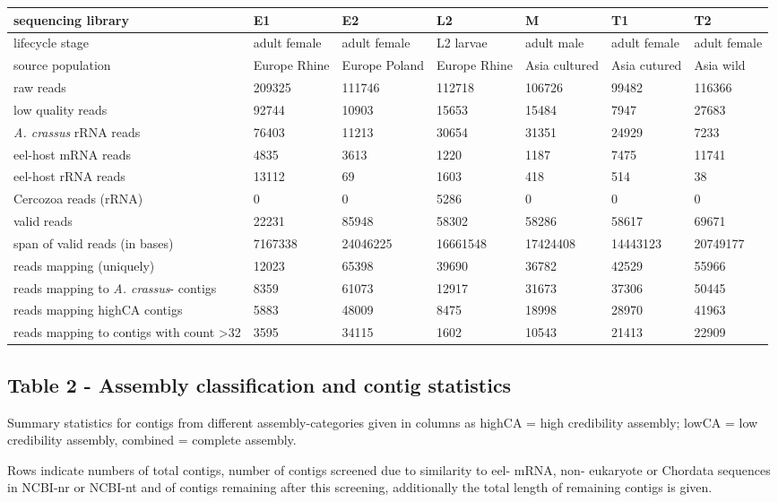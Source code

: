 \documentclass[10pt]{bmc_article}
\newenvironment{bmcformat}{\begin{raggedright}\baselineskip20pt\sloppy\setboolean{publ}{false}}{\end{raggedright}\baselineskip20pt\sloppy}
\begin{document}
\begin{bmcformat}
\begin{tabular}{p{4.5cm}p{1.5cm}p{1.5cm}p{1.5cm}p{1.5cm}p{1.5cm}p{1.5cm}}
   \hline
sequencing library & E1 & E2 & L2 & M & T1 & T2 \\ 
   \hline
lifecycle stage & adult female & adult female & L2 larvae & adult male & adult female & adult female \\ 
  source population & Europe Rhine & Europe Poland & Europe Rhine & Asia cultured & Asia cutured & Asia wild \\ 
  raw reads & 209325 & 111746 & 112718 & 106726 & 99482 & 116366 \\ 
  low quality reads & 92744 & 10903 & 15653 & 15484 & 7947 & 27683 \\ 
  \textit{A. crassus} rRNA reads & 76403 & 11213 & 30654 & 31351 & 24929 & 7233 \\ 
  eel-host mRNA reads & 4835 & 3613 & 1220 & 1187 & 7475 & 11741 \\ 
  eel-host rRNA reads & 13112 & 69 & 1603 & 418 & 514 & 38 \\ 
  Cercozoa reads (rRNA) & 0 & 0 & 5286 & 0 & 0 & 0 \\ 
  valid reads & 22231 & 85948 & 58302 & 58286 & 58617 & 69671 \\ 
  span of valid reads (in bases) & 7167338 & 24046225 & 16661548 & 17424408 & 14443123 & 20749177 \\ 
  reads mapping (uniquely) & 12023 & 65398 & 39690 & 36782 & 42529 & 55966 \\ 
  reads mapping to \textit{A. crassus}- contigs &  8359 & 61073 & 12917 & 31673 & 37306 & 50445 \\ 
  reads mapping highCA contigs &  5883 & 48009 &  8475 & 18998 & 28970 & 41963 \\ 
  reads mapping to contigs with count >32 &  3595 & 34115 &  1602 & 10543 & 21413 & 22909 \\ 
   \hline
\end{tabular}
\subsection*{Table 2 - Assembly classification and contig statistics}

Summary statistics for contigs from different assembly-categories
given in columns as highCA = high credibility assembly; lowCA = low
credibility assembly, combined = complete assembly.

Rows indicate numbers of total contigs, number of contigs screened due
to similarity to eel- mRNA, non- eukaryote or Chordata sequences in
NCBI-nr or NCBI-nt and of contigs remaining after this screening,
additionally the total length of remaining contigs is given.


\end{bmcformat}
\end{document}
